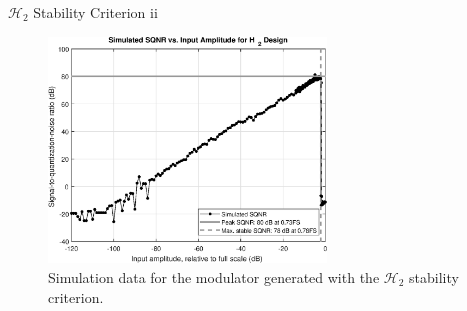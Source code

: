 \documentclass[10pt,usenames,dvipsnames]{beamer}
\begin{document}
{\begin{frame}{$\mathcal{H}_2$ Stability Criterion ii}

\begin{figure}
	\centering
	\includegraphics[height=6cm]{sqnr-h2}
	\caption{Simulation data for the modulator generated with the $\mathcal{H}_2$ stability criterion.}
\end{figure}

\end{frame}
}
\end{document}
